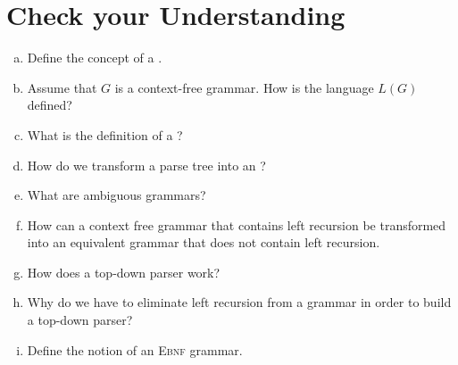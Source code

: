 \section{Check your Understanding}
\begin{enumerate}[(a)]
\item Define the concept of a .
\item Assume that $G$ is a context-free grammar.  How is the language $L(G)$ defined?
\item What is the definition of a ?
\item How do we transform a parse tree into an ?
\item What are ambiguous grammars?  
\item How can a context free grammar that contains left recursion be transformed into an equivalent grammar
      that does not contain left recursion.
\item How does a top-down parser work? 
\item Why do we have to eliminate left recursion from a grammar in order to build a top-down parser?
\item Define the notion of an \textsc{Ebnf} grammar.
\end{enumerate}

